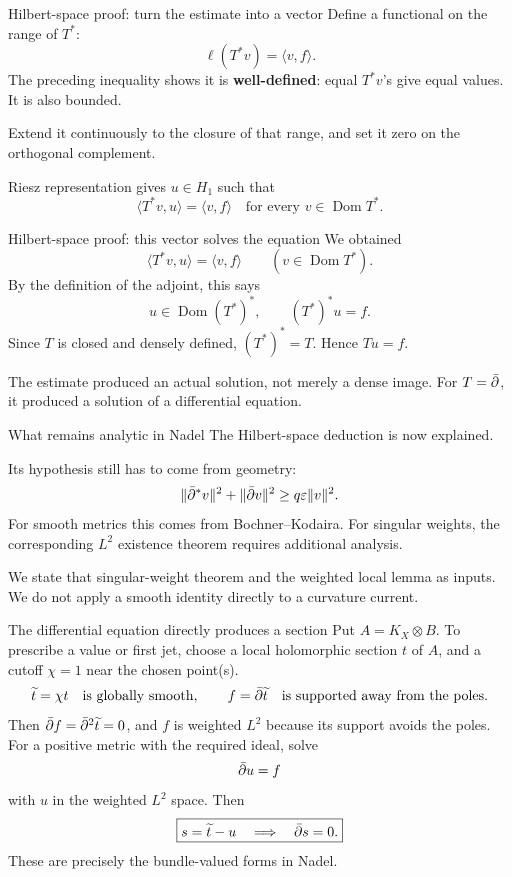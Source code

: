 \begin{frame}{Hilbert-space proof: turn the estimate into a vector}
Define a functional on the range of \(T^*\):
\[
\ell(T^*v)=\langle v,f\rangle.
\]
The preceding inequality shows it is \textbf{well-defined}: equal \(T^*v\)'s give equal values. It is also bounded.
\par\medskip
Extend it continuously to the closure of that range, and set it zero on the orthogonal complement.
\par\medskip
Riesz representation gives \(u\in H_1\) such that
\[
\boxed{\langle T^*v,u\rangle=\langle v,f\rangle
\quad\text{for every }v\in\operatorname{Dom}T^*.}
\]
\end{frame}

\begin{frame}{Hilbert-space proof: this vector solves the equation}
We obtained
\[
\langle T^*v,u\rangle=\langle v,f\rangle\qquad(v\in\operatorname{Dom}T^*).
\]
By the definition of the adjoint, this says
\[
u\in\operatorname{Dom}(T^*)^*,\qquad (T^*)^*u=f.
\]
Since \(T\) is closed and densely defined, \((T^*)^*=T\). Hence \(Tu=f\).
\par\medskip
The estimate produced an actual solution, not merely a dense image. For \(T=\bar\partial\), it produced a solution of a differential equation.
\end{frame}

\begin{frame}{What remains analytic in Nadel}
The Hilbert-space deduction is now explained.
\par\medskip
Its hypothesis still has to come from geometry:
\[
\|\bar\partial^*v\|^2+\|\bar\partial v\|^2\ge q\varepsilon\|v\|^2.
\]
For smooth metrics this comes from Bochner--Kodaira. For singular weights, the corresponding \(L^2\) existence theorem requires additional analysis.
\par\medskip
We state that singular-weight theorem and the weighted local lemma as inputs. We do not apply a smooth identity directly to a curvature current.
\end{frame}

\begin{frame}{The differential equation directly produces a section}
Put \(A=K_X\otimes B\). To prescribe a value or first jet, choose a local holomorphic section \(t\) of \(A\), and a cutoff \(\chi=1\) near the chosen point(s).
\[
\widetilde t=\chi t\quad\text{is globally smooth},\qquad
f=\bar\partial\widetilde t\quad\text{is supported away from the poles}.
\]
Then \(\bar\partial f=\bar\partial^2\widetilde t=0\), and \(f\) is weighted \(L^2\) because its support avoids the poles. For a positive metric with the required ideal, solve
\[
\bar\partial u=f
\]
with \(u\) in the weighted \(L^2\) space.
Then
\[
\boxed{s=\widetilde t-u\quad\Longrightarrow\quad\bar\partial s=0.}
\]
These are precisely the bundle-valued forms in Nadel.
\end{frame}

